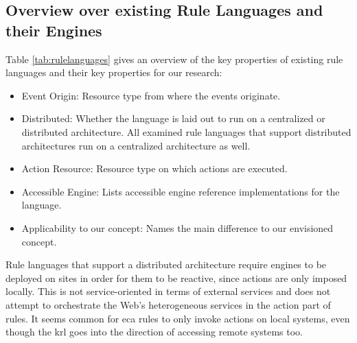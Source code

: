 \subsection{Overview over existing Rule Languages and their Engines}
Table \ref{tab:rulelanguages} gives an overview of the key properties of existing rule languages and their key properties for our research:
\begin{itemize}
  \item \textrm{Event Origin}: Resource type from where the events originate.
  \item \textrm{Distributed}: Whether the language is laid out to run on a centralized or distributed architecture. All examined rule languages that support distributed architectures run on a centralized architecture as well.
  \item \textrm{Action Resource}: Resource type on which actions are executed.
  \item \textrm{Accessible Engine}: Lists accessible engine reference implementations for the language.
  \item \textrm{Applicability to our concept}: Names the main difference to our envisioned concept.
\end{itemize}
Rule languages that support a distributed architecture require engines to be deployed on sites in order for them to be reactive, since actions are only imposed locally.
This is not service-oriented in terms of external services and does not attempt to orchestrate the Web's heterogeneous services in the action part of rules.
It seems common for \textrm{\acrshort{eca}} rules to only invoke actions on local systems, even though the \textrm{\acrshort{krl}} goes into the direction of accessing remote systems too.

